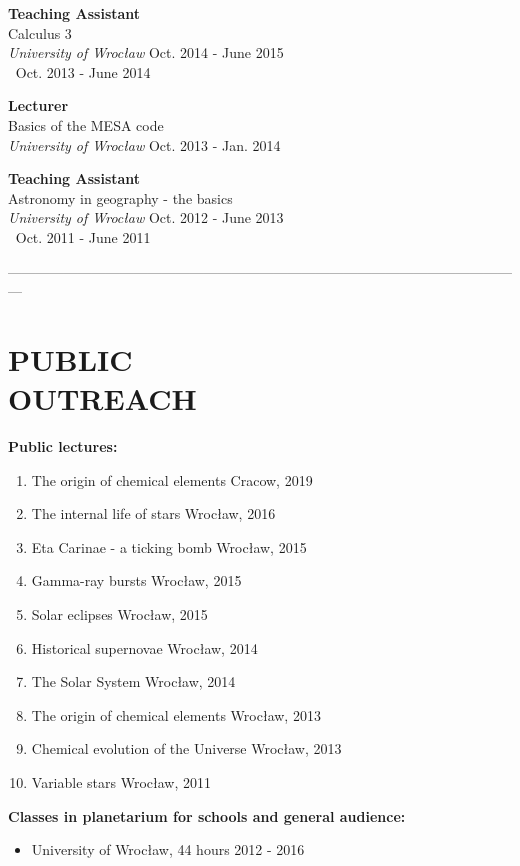 \documentclass[margin, 10pt]{res} %
\begin{document}
\begin{resume}
{\bf Teaching Assistant} \\
Calculus 3 \\
{\sl University of Wroc\l{}aw }\hfill Oct. 2014 - June 2015 \\
$~$ \hfill Oct. 2013 - June 2014

{\bf Lecturer} \\
Basics of the MESA code \\
{\sl University of Wroc\l{}aw} \hfill Oct. 2013 - Jan. 2014

{\bf Teaching Assistant} \\
Astronomy in geography - the basics \\
{\sl University of Wroc\l{}aw} \hfill Oct. 2012 - June 2013 \\
$~$ \hfill Oct. 2011 - June 2011

---------------------------------------------------------------------------------------------------------------

\section{PUBLIC \\ OUTREACH}  

\textbf{Public lectures:}
\begin{enumerate}[noitemsep]
    \item The origin of chemical elements \hfill Cracow, 2019
    \item The internal life of stars \hfill  Wroc\l{}aw, 2016
    \item Eta Carinae - a ticking bomb \hfill Wroc\l{}aw, 2015
    \item Gamma-ray bursts \hfill Wroc\l{}aw, 2015
    \item Solar eclipses \hfill Wroc\l{}aw, 2015
    \item Historical supernovae \hfill Wroc\l{}aw, 2014
    \item The Solar System \hfill Wroc\l{}aw, 2014
    \item The origin of chemical elements \hfill Wroc\l{}aw, 2013
    \item Chemical evolution of the Universe \hfill Wroc\l{}aw, 2013
    \item Variable stars \hfill Wroc\l{}aw, 2011
\end{enumerate}

\textbf{Classes in planetarium for schools and general audience:}
\begin{itemize}[noitemsep]
    \item University of Wroc\l{}aw, 44 hours \hfill 2012 - 2016
\end{itemize}


\end{resume}
\end{document}
